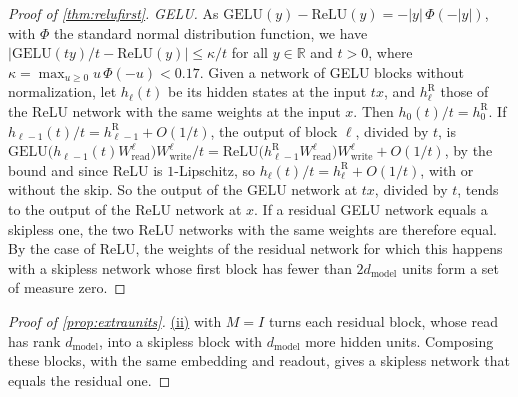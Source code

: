 \documentclass[10pt]{article}
\theoremstyle{definition}
\theoremstyle{remark}
\newcommand{\R}{\mathbb{R}}
\newcommand{\Wread}{W_{\mathrm{read}}}
\newcommand{\Wwrite}{W_{\mathrm{write}}}
\newcommand{\dm}{d_{\mathrm{model}}}
\DeclareRobustCommand{\Cpref}[2]{\hyperref[#1:#2]{\Cref*{#1}(#2)}}
\begin{document}
\begin{proof}[Proof of \cref{thm:relufirst}]
\emph{GELU.} As $\mathrm{GELU}(y) - \mathrm{ReLU}(y) = -\lvert y\rvert\,\Phi(-\lvert y\rvert)$, with $\Phi$ the standard normal distribution function, we have $\lvert\mathrm{GELU}(ty)/t - \mathrm{ReLU}(y)\rvert \le \kappa/t$ for all $y \in \R$ and $t > 0$, where $\kappa = \max_{u \ge 0} u\,\Phi(-u) < 0.17$. Given a network of GELU blocks without normalization, let $h_\ell(t)$ be its hidden states at the input $tx$, and $h^{\mathrm R}_\ell$ those of the ReLU network with the same weights at the input $x$. Then $h_0(t)/t = h^{\mathrm R}_0$. If $h_{\ell-1}(t)/t = h^{\mathrm R}_{\ell-1} + O(1/t)$, the output of block $\ell$, divided by $t$, is $\mathrm{GELU}\big(h_{\ell-1}(t)\Wread^{\ell}\big)\Wwrite^{\ell}/t = \mathrm{ReLU}\big(h^{\mathrm R}_{\ell-1}\Wread^{\ell}\big)\Wwrite^{\ell} + O(1/t)$, by the bound and since ReLU is $1$-Lipschitz, so $h_\ell(t)/t = h^{\mathrm R}_\ell + O(1/t)$, with or without the skip. So the output of the GELU network at $tx$, divided by $t$, tends to the output of the ReLU network at $x$. If a residual GELU network equals a skipless one, the two ReLU networks with the same weights are therefore equal. By the case of ReLU, the weights of the residual network for which this happens with a skipless network whose first block has fewer than $2\dm$ units form a set of measure zero.
\end{proof}


\propExtraUnits*

\begin{proof}[Proof of \cref{prop:extraunits}]
\Cpref{thm:relugelu}{ii} with $M = I$ turns each residual block, whose read has rank $\dm$, into a skipless block with $\dm$ more hidden units. Composing these blocks, with the same embedding and readout, gives a skipless network that equals the residual one.
\end{proof}

\propEveryBlock*
\end{document}
